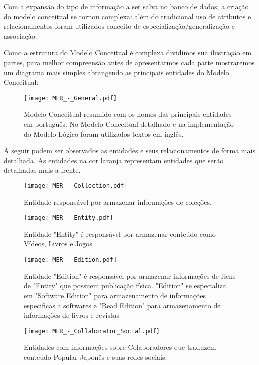 \documentclass[12pt]{article}
\begin{document}
Com a expansão do tipo de informação a ser salva no banco de dados, a criação do modelo conceitual se tornou complexa: além do tradicional uso de atributos e relacionamentos foram utilizados conceito de especialização/generalização e associação. 

Como a estrutura do Modelo Conceitual é complexa dividimos sua ilustração em partes, para melhor compreensão antes de apresentarmos cada parte mostraremos um diagrama mais simples abrangendo as principais entidades do Modelo Conceitual:

\begin{figure}[H]
\centering
\texttt{[image: MER\_-\_General.pdf]}
\caption{Modelo Conceitual resumido com os nomes das principais entidades em português. No Modelo Conceitual detalhado e na implementação do Modelo Lógico foram utilizados textos em inglês.} \label{collection}
\end{figure}

A seguir podem ser observados as entidades e seus relacionamentos de forma mais detalhada. As entidades na cor laranja representam entidades que serão detalhadas mais a frente.
\begin{figure}[H]
\centering
\texttt{[image: MER\_-\_Collection.pdf]}
\caption{Entidade responsável por armazenar informações de coleções.} \label{collection}
\end{figure}

\begin{figure}[H]
\centering
\texttt{[image: MER\_-\_Entity.pdf]}
\caption{Entidade "Entity" é responsável por armazenar conteúdo como Vídeos, Livros e Jogos.} \label{entity}
\end{figure}

\begin{figure}[H]
\centering
\texttt{[image: MER\_-\_Edition.pdf]}
\caption{Entidade "Edition" é responsável por armazenar informações de itens de "Entity" que possuem publicação física. "Edition" se especializa em "Software Edition" para armazenamento de informações especificas a softwares e "Read Edition" para armazenamento de informações de livros e revistas} \label{edition}
\end{figure}

\begin{figure}[H]
\centering
\texttt{[image: MER\_-\_Collaborator\_Social.pdf]}
\caption{Entidades com informações sobre Colaboradores que traduzem conteúdo Popular Japonês e suas redes sociais.} \label{collaborator}
\end{figure}
\end{document}
